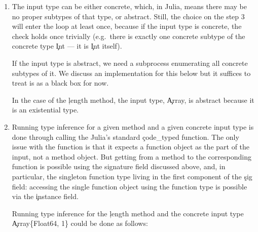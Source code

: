 \begin{enumerate}
  A signature of a method will usually have the special singleton function
  type (\c{typeof(...)}) as the first component, and the rest is (easy to
  convert to) the type of the input --- an $n$-tuple. In this example, the type of
  the input is 1-tuple, consisting of the existential array type
  \c{Array\{T, N\}\ where T where N} abbreviated simply as \c{Array}\footnote{%
A user can always look under the abbreviation using the \c{dump} function.
}.

  \item The input type can be either concrete, which, in Julia, means there may
  be no proper subtypes of that type, or abstract. Still, the choice on the
  step 3 will enter the loop at least once, because if the input type is
  concrete, the check holds once trivially (e.g.\ there is exactly one concrete
  subtype of the concrete type \c{Int} --- it is \c{Int} itself).

  If the input type is abstract, we need a subprocess enumerating all concrete
  subtypes of it. We discuss an implementation for this below but it suffices to
  treat is as a black box for now. %

  In the case of the \c{length} method, the input type, \c{Array}, is abstract
  because it is an existential type.

  \item Running type inference for a given method and a given concrete input
  type is done through calling the Julia's standard \c{code\_typed} function.
  The only issue with the function is that it expects a function object as the
  part of the input, not a method object. But getting from a method to the
  corresponding function is possible using the signature field discussed above,
  and, in particular, the singleton function type living in the first component
  of the \c{sig} field: accessing the single function object using the function
  type is possible via the \c{instance} field.

  Running type inference for the \c{length} method and the concrete input type
  \c{Array\{Float64, 1\}} could be done as follows:


\end{enumerate}
